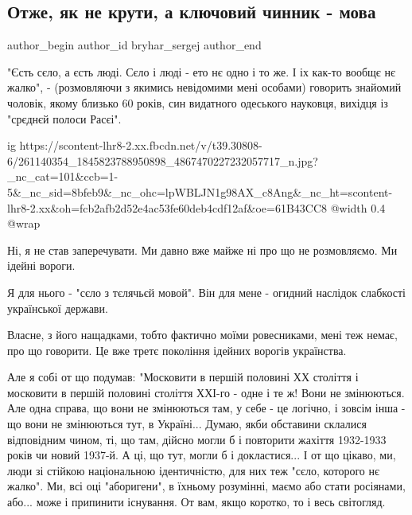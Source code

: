  
 
 
 
 
 
\subsection{Отже, як не крути, а ключовий чинник - мова}
\label{sec:30_11_2021.fb.bryhar_sergej.1.mova}
 
\ifcmt
 author_begin
   author_id bryhar_sergej
 author_end
\fi

"Єсть сєло, а єсть люді. Сєло і люді - ето нє одно і то же. І іх как-то вообщє
нє жалко", - (розмовляючи з якимись невідомими мені особами) говорить знайомий
чоловік, якому близько 60 років, син видатного одеського науковця, вихідця із
"срєднєй полоси Расєі".

\ifcmt
  ig https://scontent-lhr8-2.xx.fbcdn.net/v/t39.30808-6/261140354_1845823788950898_4867470227232057717_n.jpg?_nc_cat=101&ccb=1-5&_nc_sid=8bfeb9&_nc_ohc=lpWBLJN1g98AX_c8Ang&_nc_ht=scontent-lhr8-2.xx&oh=fcb2afb2d52e4ac53fe60deb4cdf12af&oe=61B43CC8
  @width 0.4
  @wrap 
\fi

Ні, я не став заперечувати. Ми давно вже майже ні про що не розмовляємо. Ми
ідейні вороги.

Я для нього - "сєло з тєлячьєй мовой". Він для мене - огидний наслідок
слабкості української держави.

Власне, з його нащадками, тобто фактично моїми ровесниками, мені теж немає, про
що говорити. Це вже третє покоління ідейних ворогів українства.

Але я собі от що подумав: "Московити в першій половині ХХ століття і московити
в першій половині століття ХХІ-го - одне і те ж! Вони не змінюються. Але одна
справа, що вони не змінюються там, у себе - це логічно, і зовсім інша - що вони
не змінюються тут, в Україні... Думаю, якби обставини склалися відповідним
чином, ті, що там, дійсно могли б і повторити жахіття 1932-1933 років чи новий
1937-й. А ці, що тут, могли б і докластися... І от що цікаво, ми, люди зі
стійкою національною ідентичністю, для них теж "сєло, которого нє жалко". Ми,
всі оці "аборигени", в їхньому розумінні, маємо або стати росіянами, або...
може і припинити існування. От вам, якщо коротко, то і весь світогляд.

